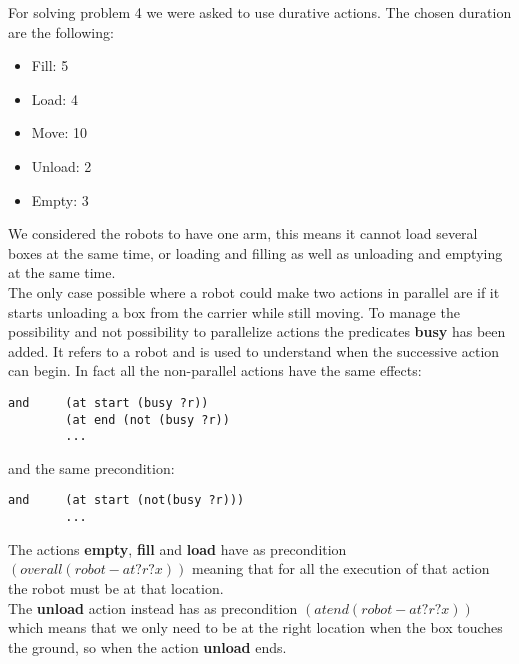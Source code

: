 For solving problem 4 we were asked to use durative actions.
The chosen duration are the following:
\begin{itemize}
    \item Fill: 5
    \item Load: 4
    \item Move: 10
    \item Unload: 2
    \item Empty: 3
\end{itemize}
We considered the robots to have one arm, this means it cannot load several boxes at the same time, or loading and filling as well as unloading and emptying at the same time.\\
The only case possible where a robot could make two actions in parallel are if it starts unloading a box from the carrier while still moving.
To manage the possibility and not possibility to parallelize actions the predicates \textbf{busy} has been added.
It refers to a robot and is used to understand when the successive action can begin.
In fact all the non-parallel actions have the same effects:
\begin{verbatim}
and     (at start (busy ?r))
        (at end (not (busy ?r))
        ...
\end{verbatim}
and the same precondition:
\begin{verbatim}
and     (at start (not(busy ?r)))
        ...
\end{verbatim}
The actions \textbf{empty}, \textbf{fill} and \textbf{load} have as precondition $(over all (robot-at ?r ?x))$
meaning that for all the execution of that action the robot must be at that location. \\
The \textbf{unload} action instead has as precondition $(at end(robot-at ?r ?x))$ which means that we only need to be at the right location
when the box touches the ground, so when the action \textbf{unload} ends.